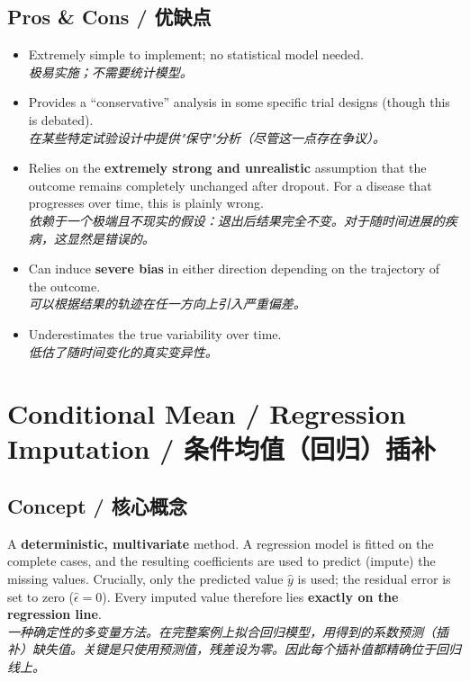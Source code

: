\documentclass[9pt, a4paper]{article}
\begin{document}
\subsection{Pros \& Cons / 优缺点}
\begin{tcolorbox}[prosbox]
    \begin{itemize}
        \item [\ding{51}] Extremely simple to implement; no statistical model needed.\\
        \textit{极易实施；不需要统计模型。}
        \item [\ding{51}] Provides a ``conservative'' analysis in some specific trial designs (though this is debated).\\
        \textit{在某些特定试验设计中提供"保守"分析（尽管这一点存在争议）。}
    \end{itemize}
\end{tcolorbox}
\begin{tcolorbox}[consbox]
    \begin{itemize}
        \item [\ding{55}] Relies on the \textbf{extremely strong and unrealistic} assumption that the outcome remains completely unchanged after dropout. For a disease that progresses over time, this is plainly wrong.\\
        \textit{依赖于一个极端且不现实的假设：退出后结果完全不变。对于随时间进展的疾病，这显然是错误的。}
        \item [\ding{55}] Can induce \textbf{severe bias} in either direction depending on the trajectory of the outcome.\\
        \textit{可以根据结果的轨迹在任一方向上引入严重偏差。}
        \item [\ding{55}] Underestimates the true variability over time.\\
        \textit{低估了随时间变化的真实变异性。}
    \end{itemize}
\end{tcolorbox}

\section{Conditional Mean / Regression Imputation / 条件均值（回归）插补}

\subsection{Concept / 核心概念}
\begin{tcolorbox}[defbox]
    A \textbf{deterministic, multivariate} method. A regression model is fitted on the complete cases, and the resulting coefficients are used to predict (impute) the missing values. Crucially, only the predicted value $\hat{y}$ is used; the residual error is set to zero ($\hat{\epsilon} = 0$). Every imputed value therefore lies \textbf{exactly on the regression line}.\\
    \textit{一种确定性的多变量方法。在完整案例上拟合回归模型，用得到的系数预测（插补）缺失值。关键是只使用预测值，残差设为零。因此每个插补值都精确位于回归线上。}
\end{tcolorbox}
\end{document}
